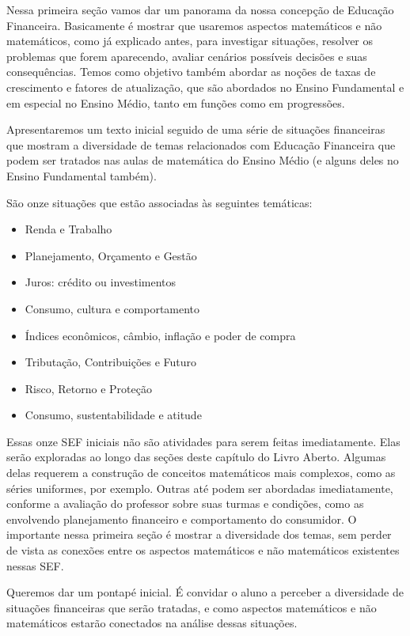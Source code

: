 \def\currentcolor{session1}
\begin{texto}
{
  Nessa primeira seção vamos dar um panorama da nossa concepção de Educação Financeira. Basicamente é mostrar que usaremos aspectos matemáticos e não matemáticos, como já explicado antes, para investigar situações, resolver os problemas que forem aparecendo, avaliar cenários possíveis decisões e suas consequências. Temos como objetivo também abordar as noções de taxas de crescimento e fatores de atualização, que são abordados no Ensino Fundamental e em especial no Ensino Médio, tanto em funções como em progressões. 

  Apresentaremos um texto inicial seguido de uma série de situações financeiras que mostram a diversidade de temas relacionados com Educação Financeira que podem ser tratados nas aulas de matemática do Ensino Médio (e alguns deles no Ensino Fundamental também).

  São onze situações que estão associadas às seguintes temáticas:
  \begin{itemize}
  \item Renda e Trabalho
  \item Planejamento, Orçamento e Gestão
  \item Juros: crédito ou investimentos
  \item Consumo, cultura e comportamento
  \item Índices econômicos, câmbio, inflação e poder de compra
  \item Tributação, Contribuições e Futuro
  \item Risco, Retorno e Proteção
  \item Consumo, sustentabilidade e atitude
  \end{itemize}

  Essas onze SEF iniciais não são atividades para serem feitas imediatamente. Elas serão exploradas ao longo das seções deste capítulo do Livro Aberto. Algumas delas requerem a construção de conceitos matemáticos mais complexos, como as séries uniformes, por exemplo. Outras até podem ser abordadas imediatamente, conforme a avaliação do professor sobre suas turmas e condições, como as envolvendo planejamento financeiro e comportamento do consumidor. O importante nessa primeira seção é mostrar a diversidade dos temas, sem perder de vista as conexões entre os aspectos matemáticos e não matemáticos existentes nessas SEF.

  Queremos dar um pontapé inicial. É convidar o aluno a perceber a diversidade de situações financeiras que serão tratadas, e como aspectos matemáticos e não matemáticos estarão conectados na análise dessas situações.

}
\end{texto}
